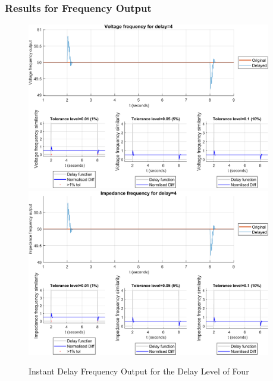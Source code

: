 \subsubsection{Results for Frequency Output}


\begin{figure}
    \caption{Instant Delay Frequency Output for the Delay Level of Four}
    \includegraphics[width=0.95\textwidth]{PMUsim-figures/DelayOf_4/Instant_vFrequency.png}    
    \label{fig:PMUsim_Four_vFrequency}
    \includegraphics[width=0.95\textwidth]{PMUsim-figures/DelayOf_4/Instant_iFrequency.png}    
    \label{fig:PMUsim_Four_Frequency}
        \begin{small}
     \end{small}
\end{figure}


